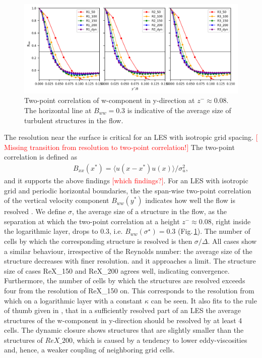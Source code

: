 \documentclass[a4paper,11pt]{article}
\newcommand{\todo}[1]{\textcolor{red}{$[$#1$]$}}
\begin{document}
\begin{figure}[ht]
  \centerline{\includegraphics[width=\textwidth]{figures_2024/d3y_2pc_ww_3Re_0.079.png}}
  \caption{Two-point correlation of w-component in y-direction at $z^-\approx 0.08$. The horizontal line at $B_{ww}=0.3$ is indicative of the average size of turbulent structures in the flow.}
  \label{fig:2pc_008}
\end{figure}

The resolution near the surface is critical for an LES with isotropic grid spacing. \todo{Missing transition from resolution to two-point correlation!} The two-point correlation is defined as 
\begin{align}
  B_{xx}\left(x^*\right) = \langle u\left(x-x^*\right)u\left(x\right)\rangle/\sigma_u^2,
\end{align}
and it supports the above findings \todo{which findings?}. 
For an LES with isotropic grid and periodic horizontal boundaries, the the span-wise two-point correlation of the vertical velocity component $B_{ww}(y^*)$ indicates how well the flow is resolved \citep{wurps2020grid}. We define $\sigma$, the average size of a structure in the flow, as the separation at which the two-point correlation at a height $z^-\approx 0.08$, right inside the logarithmic layer, drops to 0.3, i.e. $B_{ww}(\sigma^\star) = 0.3$ (Fig.\,\ref{fig:2pc_008}). The number of cells by which the corresponding structure is resolved is then $\sigma/\Delta$. All cases show a similar behaviour, irrespective of the Reynolds number: the average size of the structure decreases with finer resolution. and it approaches a limit. The structure size of cases ReX\_150 and ReX\_200 agrees well, indicating convergence. Furthermore, the number of cells by which the structures are resolved exceeds four from the resolution of ReX\_150 on. This corresponds to the resolution from which on a logarithmic layer with a constant $\kappa$ can be seen. It also fits to the rule of thumb given in \cite{wurps2020grid}, that in a sufficiently resolved part of an LES the average structures of the w-component in y-direction should be resolved by at least 4 cells. The dynamic closure shows structures that are slightly smaller than the structures of $ReX\_200$, which is caused by a tendency to lower eddy-viscosities and, hence, a weaker coupling of neighboring grid cells.
\end{document}

